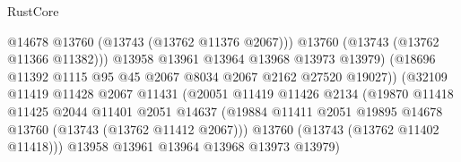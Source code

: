 \begin{lexlean}{RustCore}
\begin{coremodule}
                                            @14678
                                            @13760
                                            (@13743 (@13762 @11376 @2067)))
                                          @13760
                                          (@13743 (@13762 @11366 @11382)))
                                        @13958
                                        @13961
                                        @13964
                                        @13968
                                        @13973
                                        @13979)
                                      (@18696
                                        @11392
                                        @1115
                                        @95
                                        @45
                                        @2067
                                        @8034
                                        @2067
                                        @2162
                                        @27520
                                        @19027))
                                    (@32109
                                      @11419
                                      @11428
                                      @2067
                                      @11431
                                      (@20051
                                        @11419
                                        @11426
                                        @2134
                                        (@19870
                                          @11418
                                          @11425
                                          @2044
                                          @11401
                                          @2051
                                          @14637
                                          (@19884
                                            @11411
                                            @2051
                                            @19895
                                            @14678
                                            @13760
                                            (@13743 (@13762 @11412 @2067)))
                                          @13760
                                          (@13743 (@13762 @11402 @11418)))
                                        @13958
                                        @13961
                                        @13964
                                        @13968
                                        @13973
                                        @13979)

\end{coremodule}
\end{lexlean}
